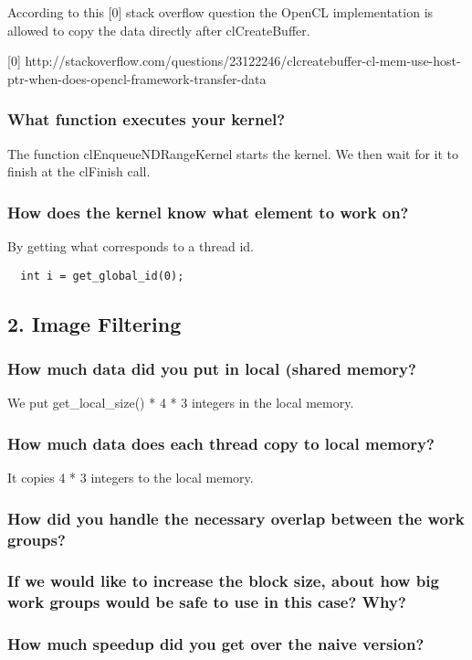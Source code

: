\documentclass[a4paper,12pt]{article}
\begin{document}
According to this [0] stack overflow question the OpenCL implementation is allowed to copy the data directly after clCreateBuffer.

[0] http://stackoverflow.com/questions/23122246/clcreatebuffer-cl-mem-use-host-ptr-when-does-opencl-framework-transfer-data


\subsubsection{What function executes your kernel?}

The function clEnqueueNDRangeKernel starts the kernel. We then wait for it to finish at the clFinish call.


\subsubsection{How does the kernel know what element to work on?}

By getting what corresponds to a thread id.

\begin{lstlisting}
  int i = get_global_id(0);
\end{lstlisting}



\subsection{2. Image Filtering}

\subsubsection{How much data did you put in local (shared memory?}

We put get_local_size() * 4 * 3 integers in the local memory.

\subsubsection{How much data does each thread copy to local memory?}

It copies 4 * 3 integers to the local memory.

\subsubsection{How did you handle the necessary overlap between the work groups?}



\subsubsection{If we would like to increase the block size, about how big work groups would be safe to use in this case? Why?}

\subsubsection{How much speedup did you get over the naive version?}
\end{document}
